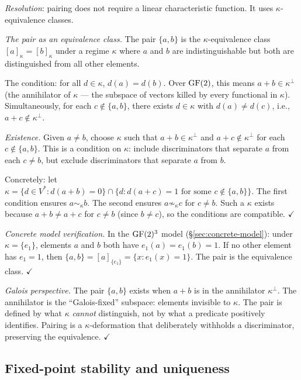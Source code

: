 \emph{Resolution}: pairing does not require a linear
characteristic function. It uses $\kappa$-equivalence
classes.

\emph{The pair as an equivalence class.}
The pair $\{a, b\}$ is the $\kappa$-equivalence class
$[a]_\kappa = [b]_\kappa$ under a regime $\kappa$ where
$a$ and $b$ are indistinguishable but both are
distinguished from all other elements.

The condition: for all $d \in \kappa$, $d(a) = d(b)$.
Over $\operatorname{GF}(2)$, this means $a + b \in \kappa^\perp$
(the annihilator of $\kappa$ --- the subspace of vectors
killed by every functional in $\kappa$). Simultaneously,
for each $c \notin \{a, b\}$, there exists $d \in \kappa$
with $d(a) \neq d(c)$, i.e., $a + c \notin \kappa^\perp$.

\emph{Existence.} Given $a \neq b$, choose $\kappa$ such
that $a + b \in \kappa^\perp$ and $a + c \notin
\kappa^\perp$ for each $c \notin \{a, b\}$. This is a
condition on $\kappa$: include discriminators that
separate $a$ from each $c \neq b$, but exclude
discriminators that separate $a$ from $b$.

Concretely: let $\kappa = \{d \in V^* : d(a + b) = 0\}
\cap \{d : d(a + c) = 1 \text{ for some } c \notin
\{a,b\}\}$. The first condition ensures $a \sim_\kappa b$.
The second ensures $a \not\sim_\kappa c$ for $c \neq b$.
Such a $\kappa$ exists because $a + b \neq a + c$ for
$c \neq b$ (since $b \neq c$), so the conditions are
compatible. $\checkmark$

\emph{Concrete model verification.}
In the $\operatorname{GF}(2)^3$ model (\S\ref{sec:concrete-model}):
under $\kappa = \{e_1\}$, elements $a$ and $b$ both have
$e_1(a) = e_1(b) = 1$. If no other element has $e_1 = 1$,
then $\{a, b\} = [a]_{\{e_1\}} = \{x : e_1(x) = 1\}$.
The pair is the equivalence class. $\checkmark$

\emph{Galois perspective.}
The pair $\{a, b\}$ exists when $a + b$ is in the
annihilator $\kappa^\perp$. The annihilator is the
``Galois-fixed'' subspace: elements invisible to $\kappa$.
The pair is defined by what $\kappa$ \emph{cannot}
distinguish, not by what a predicate positively
identifies. Pairing is a $\kappa$-deformation that
deliberately withholds a discriminator, preserving the
equivalence. $\checkmark$


\subsection{Fixed-point stability and uniqueness}
\label{app:fixed-point-stability}


